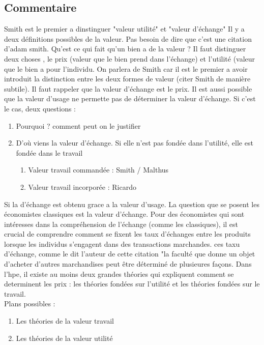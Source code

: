 \documentclass{article}
\begin{document}
\subsection{Commentaire}
Smith est le premier a dinstinguer "valeur utilité" et "valeur d'échange"
Il y a deux définitions possibles de la valeur. Pas besoin de dire que c'est une citation d'adam smith. Qu'est ce qui fait qu'un bien a de la valeur ? Il faut distinguer deux choses , le prix (valeur que le bien prend dans l'échange) et l'utilité (valeur que le bien a pour l'individu. On parlera de Smith car il est le premier a avoir introduit la distinction entre les deux formes de valeur (citer Smith de manière subtile).
Il faut rappeler que la valeur d'échange est le prix. Il est aussi possible que la valeur d'usage ne permette pas de déterminer la valeur d'échange.
Si c'est le cas, deux questions : 
\begin{enumerate}
	\item Pourquoi ? comment peut on le justifier
	\item D'où viens la valeur d'échange. Si elle n'est pas fondée dans l'utilité, elle est fondée dans le travail
	\begin{enumerate}
		\item Valeur travail commandée : Smith / Malthus
		\item Valeur travail incorporée : Ricardo
	\end{enumerate}
\end{enumerate}
Si la d'échange est obtenu grace a la valeur d'usage. La question que se posent les économistes classiques est la valeur d'échange. Pour des économistes qui sont intéresses dans la compréhension de l'échange (comme les classiques), il est crucial de comprendre comment se fixent les taux d'échanges entre les produits lorsque les individus s'engagent dans des transactions marchandes. ces taxu d'échange, comme le dit l'auteur de cette citation "la faculté que donne un objet d'acheter d'autres marchandises peut être déterminé de plusieures façons. Dans l'hpe, il existe au moins deux grandes théories qui expliquent comment se determinent les prix : les théories fondées sur l'utilité et les théories fondées sur le travail. \\
Plans possibles : 
\begin{enumerate}
	\item Les théories de la valeur travail
	\item Les théories de la valeur utilité
\end{enumerate}
\end{document}
